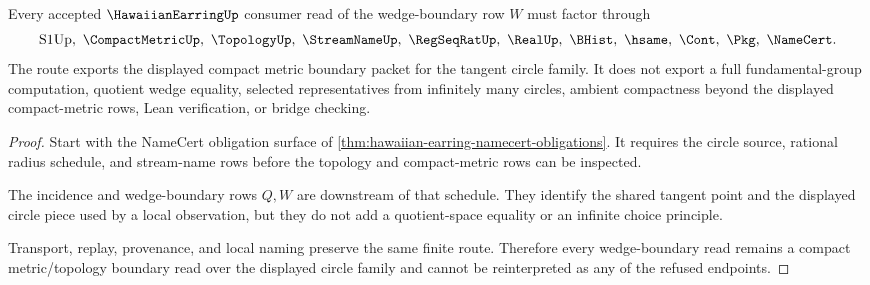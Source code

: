 \begin{theorem}
\label{thm:hawaiian-earring-circle-wedge-route}
Every accepted $\HawaiianEarringUp$ consumer read of the wedge-boundary row $W$ must factor through
$$
\text{S1Up},\ \CompactMetricUp,\ \TopologyUp,\ \StreamNameUp,\ \RegSeqRatUp,\ \RealUp,\ \BHist,\ \hsame,\ \Cont,\ \Pkg,\ \NameCert .
$$
The route exports the displayed compact metric boundary packet for the tangent circle family. It does not export a full fundamental-group computation, quotient wedge equality, selected representatives from infinitely many circles, ambient compactness beyond the displayed compact-metric rows, Lean verification, or bridge checking.
\end{theorem}
\begin{proof}
Start with the NameCert obligation surface of \autoref{thm:hawaiian-earring-namecert-obligations}. It requires the circle source, rational radius schedule, and stream-name rows before the topology and compact-metric rows can be inspected.

The incidence and wedge-boundary rows $Q,W$ are downstream of that schedule. They identify the shared tangent point and the displayed circle piece used by a local observation, but they do not add a quotient-space equality or an infinite choice principle.

Transport, replay, provenance, and local naming preserve the same finite route. Therefore every wedge-boundary read remains a compact metric/topology boundary read over the displayed circle family and cannot be reinterpreted as any of the refused endpoints.
\end{proof}




